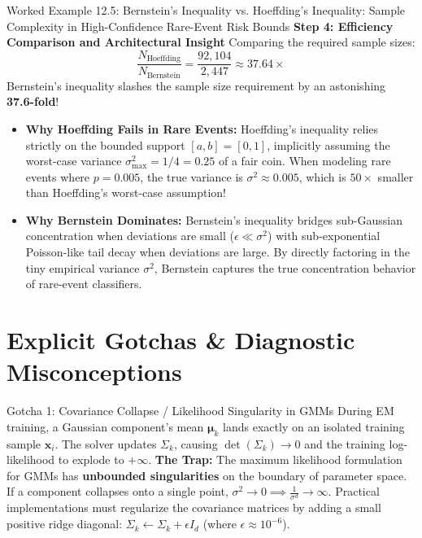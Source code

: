 \begin{examplebox}[breakable]{Worked Example 12.5: Bernstein's Inequality vs. Hoeffding's Inequality: Sample Complexity in High-Confidence Rare-Event Risk Bounds}
\textbf{Step 4: Efficiency Comparison and Architectural Insight}
Comparing the required sample sizes:
\begin{equation}
\frac{N_{\text{Hoeffding}}}{N_{\text{Bernstein}}} = \frac{92{,}104}{2{,}447} \approx \mathbf{37.64\times}
\end{equation}
Bernstein's inequality slashes the sample size requirement by an astonishing \textbf{37.6-fold}!
\begin{itemize}
    \item \textbf{Why Hoeffding Fails in Rare Events:} Hoeffding's inequality relies strictly on the bounded support $[a, b] = [0, 1]$, implicitly assuming the worst-case variance $\sigma_{\max}^2 = 1/4 = 0.25$ of a fair coin. When modeling rare events where $p = 0.005$, the true variance is $\sigma^2 \approx 0.005$, which is $50\times$ smaller than Hoeffding's worst-case assumption!
    \item \textbf{Why Bernstein Dominates:} Bernstein's inequality bridges sub-Gaussian concentration when deviations are small ($\epsilon \ll \sigma^2$) with sub-exponential Poisson-like tail decay when deviations are large. By directly factoring in the tiny empirical variance $\sigma^2$, Bernstein captures the true concentration behavior of rare-event classifiers.
\end{itemize}
\end{examplebox}

\section{Explicit Gotchas \& Diagnostic Misconceptions}

\begin{trapbox}{Gotcha 1: Covariance Collapse / Likelihood Singularity in GMMs}
During EM training, a Gaussian component's mean $\boldsymbol{\mu}_k$ lands exactly on an isolated training sample $\mathbf{x}_i$. The solver updates $\Sigma_k$, causing $\det(\Sigma_k) \to 0$ and the training log-likelihood to explode to $+\infty$.
\textbf{The Trap:} The maximum likelihood formulation for GMMs has \textbf{unbounded singularities} on the boundary of parameter space. If a component collapses onto a single point, $\sigma^2 \to 0 \implies \frac{1}{\sigma^d} \to \infty$. Practical implementations must regularize the covariance matrices by adding a small positive ridge diagonal: $\Sigma_k \leftarrow \Sigma_k + \epsilon I_d$ (where $\epsilon \approx 10^{-6}$).
\end{trapbox}

